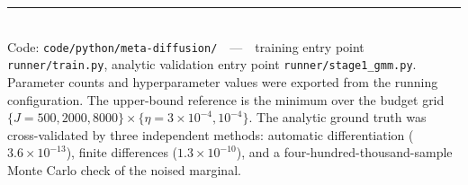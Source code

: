 \documentclass[11pt]{article}
\begin{document}
\vfill
\noindent\rule{\linewidth}{0.4pt}\\[3pt]
{\footnotesize\color{greyc}
Code: \texttt{code/python/meta-diffusion/}\ \ ---\ \ training entry point \texttt{runner/train.py},
analytic validation entry point \texttt{runner/stage1\_gmm.py}. Parameter counts and hyperparameter
values were exported from the running configuration. The upper-bound reference is the minimum over
the budget grid $\{J=500,2000,8000\}\times\{\eta=3\!\times\!10^{-4},10^{-4}\}$. The analytic ground
truth was cross-validated by three independent methods: automatic differentiation
($3.6\times10^{-13}$), finite differences ($1.3\times10^{-10}$), and a four-hundred-thousand-sample
Monte Carlo check of the noised marginal.}
\end{document}
